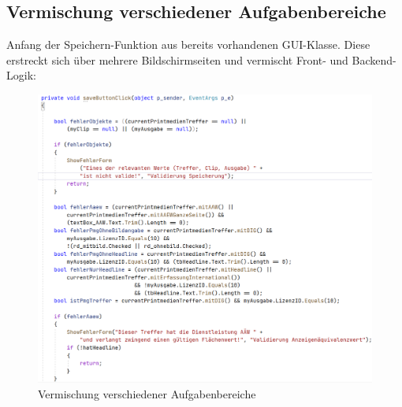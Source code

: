 \documentclass[11pt,toc=sectionentrywithoutdots, 
headheight=44pt, headings=optiontoheadandtoc, hyperfootnotes=false, hypertexnames=false]{scrartcl}
\begin{document}
 \subsection{Vermischung verschiedener Aufgabenbereiche}
 \label{fig:Vermischung verschiedener Aufgabenbereiche}
Anfang der Speichern-Funktion aus bereits vorhandenen GUI-Klasse. Diese erstreckt sich über mehrere Bildschirmseiten und vermischt Front- und Backend-Logik:
 \begin{figure}[htp]
 \centering

	\includegraphics[scale=0.6]{SeparationOfConcerns.png}
	 \caption{Vermischung verschiedener Aufgabenbereiche}
 \end{figure}
 \clearpage
\end{document}
